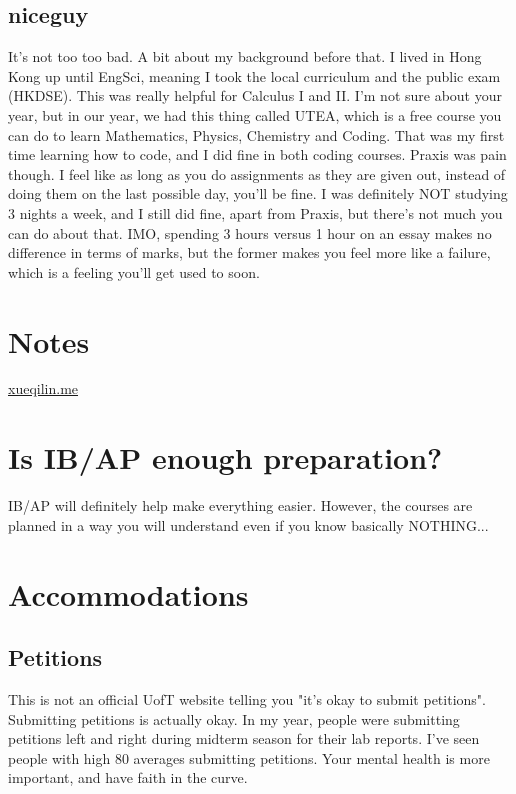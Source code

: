 \subsection{niceguy}

It's not too too bad. A bit about my background before that. I lived in Hong Kong up until EngSci, meaning I took the local curriculum and the public exam (HKDSE). This was really helpful for Calculus I and II. I'm not sure about your year, but in our year, we had this thing called UTEA, which is a free course you can do to learn Mathematics, Physics, Chemistry and Coding. That was my first time learning how to code, and I did fine in both coding courses. Praxis was pain though. I feel like as long as you do assignments as they are given out, instead of doing them on the last possible day, you'll be fine. I was definitely NOT studying 3 nights a week, and I still did fine, apart from Praxis, but there's not much you can do about that. IMO, spending 3 hours versus 1 hour on an essay makes no difference in terms of marks, but the former makes you feel more like a failure, which is a feeling you'll get used to soon.

\section{Notes}

\url{xueqilin.me}
\section{Is IB/AP enough preparation?}

IB/AP will definitely help make everything easier. However, the courses are planned in a way you will understand even if you know basically NOTHING...

\section{Accommodations}

\subsection{Petitions}

This is not an official UofT website telling you "it's okay to submit petitions". Submitting petitions is actually okay. In my year, people were submitting petitions left and right during midterm season for their lab reports. I've seen people with high 80 averages submitting petitions. Your mental health is more important, and have faith in the curve.

